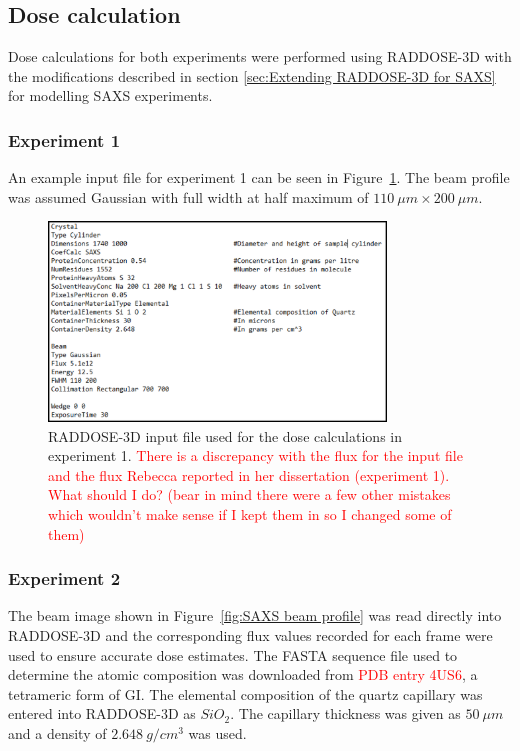 \subsection{Dose calculation}
\label{sub:Dose calculation}
Dose calculations for both experiments were performed using RADDOSE-3D with the modifications described in section \ref{sec:Extending RADDOSE-3D for SAXS} for modelling SAXS experiments.

\subsubsection{Experiment 1}
\label{subs:Experiment 1 - dose calc}
An example input file for experiment 1 can be seen in Figure~\ref{fig:SAXS example input - Rebecca}. The beam profile was assumed Gaussian with full width at half maximum of $110\ \mu m \times 200\ \mu m$.
\begin{figure}
    \centering
    \includegraphics[width=0.8\textwidth]{figures/saxs/rebecca_raddose_input.png}
    \caption{RADDOSE-3D input file used for the dose calculations in experiment 1. \textcolor{red}{There is a discrepancy with the flux for the input file and the flux Rebecca reported in her dissertation (experiment 1). What should I do? (bear in mind there were a few other mistakes which wouldn't make sense if I kept them in so I changed some of them)}
    }
    \label{fig:SAXS example input - Rebecca}
\end{figure}

\subsubsection{Experiment 2}
\label{subs:Experiment 2 - dose calc}
The beam image shown in Figure~\ref{fig:SAXS beam profile} was read directly into RADDOSE-3D and the corresponding flux values recorded for each frame were used to ensure accurate dose estimates.
The FASTA sequence file used to determine the atomic composition was downloaded from \textcolor{red}{PDB entry 4US6}, a tetrameric form of GI.
The elemental composition of the quartz capillary was entered into RADDOSE-3D as $SiO_2$.
The capillary thickness was given as $50\ \mu m$ and a density of $2.648\ g/cm^3$ was used.
